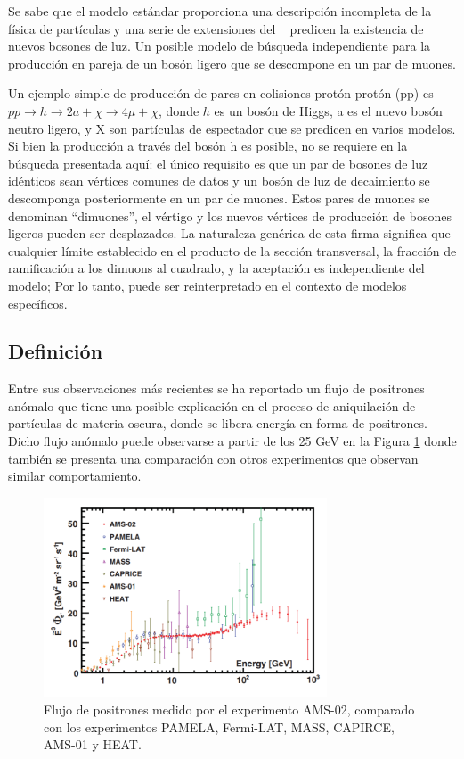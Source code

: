 Se sabe que el modelo estándar proporciona una descripción incompleta de la física de partículas y una serie de extensiones del \ME ~ predicen la existencia de nuevos bosones de luz. Un posible modelo de búsqueda independiente para la producción en pareja de un bosón ligero que se descompone en un par de muones. 

Un ejemplo simple de producción de pares en colisiones protón-protón (pp) es $pp \rightarrow h \rightarrow 2a + \chi \rightarrow 4\mu + \chi$, donde $h$ es un bosón de Higgs, a es el nuevo bosón neutro ligero, y X son partículas de espectador que se predicen en varios modelos. Si bien la producción a través del bosón h es posible, no se requiere en la búsqueda presentada aquí: el único requisito es que un par de bosones de luz idénticos sean vértices comunes de datos y un bosón de luz de decaimiento se descomponga posteriormente en un par de muones. Estos pares de muones se denominan ``dimuones'', el vértigo y los nuevos vértices de producción de bosones ligeros pueden ser desplazados. La naturaleza genérica de esta firma significa que cualquier límite establecido en el producto de la sección transversal, la fracción de ramificación a los dimuons al cuadrado, y la aceptación es independiente del modelo; Por lo tanto, puede ser reinterpretado en el contexto de modelos específicos.


\subsection{Definición}

Entre sus observaciones más recientes \cite{ams:cern} se ha reportado un flujo de positrones anómalo que tiene una posible explicación en el proceso de aniquilación de partículas de materia oscura, donde se libera energía en forma de positrones. Dicho flujo anómalo puede observarse
a partir de los 25 GeV en la Figura \ref{fig:AMS_positronflux} donde también se presenta una comparación con otros experimentos que observan similar comportamiento.

\begin{figure}[ht!]
    \centering
    \includegraphics[width=0.75\textwidth]{Fisica_de_Particulas/imagenes/AMS_positronflux.png}
    \caption{Flujo de positrones medido por el experimento AMS-02, comparado con los experimentos PAMELA, Fermi-LAT, MASS, CAPIRCE, AMS-01 y HEAT.}
    \label{fig:AMS_positronflux}
\end{figure}

